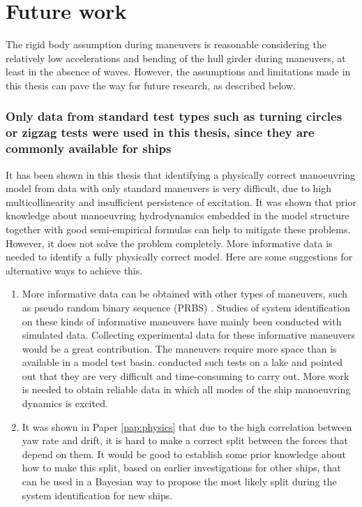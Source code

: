 \chapter{Future work\label{ch:future_work}}

The rigid body assumption during maneuvers is reasonable considering the relatively low accelerations and bending of the hull girder during maneuvers, at least in the absence of waves. However, the assumptions and limitations made in this thesis can pave the way for future research, as described below.

\subsection*{Only data from standard test types such as turning circles or zigzag tests were used in this thesis, since they are commonly available for ships}
It has been shown in this thesis that identifying a physically correct manoeuvring model from data with only standard maneuvers is very difficult, due to high multicollinearity and insufficient persistence of excitation. 
It was shown that prior knowledge about manoeuvring hydrodynamics embedded in the model structure together with good semi-empirical formulas can help to mitigate these problems.
However, it does not solve the problem completely. More informative data is needed to identify a fully physically correct model. Here are some suggestions for alternative ways to achieve this.
\begin{enumerate}[label=(\roman*),itemsep=1mm]
    
    \item More informative data can be obtained with other types of maneuvers, such as pseudo random binary sequence (PRBS) \cite{yoonIdentificationHydrodynamicCoefficients2003,wangOptimalDesignExcitation2020}. Studies of system identification on these kinds of informative maneuvers have mainly been conducted with simulated data. Collecting experimental data for these informative maneuvers would be a great contribution. The maneuvers require more space than is available in a model test basin. \textcite{millerShipModelIdentification2021} conducted such tests on a lake and pointed out that they are very difficult and time-consuming to carry out. More work is needed to obtain reliable data in which all modes of the ship manoeuvring dynamics is excited.
    
    \item It was shown in Paper \ref{pap:physics} that due to the high correlation between yaw rate and drift, it is hard to make a correct split between the forces that depend on them. It would be good to establish some prior knowledge about how to make this split, based on earlier investigations for other ships, that can be used in a Bayesian way to propose the most likely split during the system identification for new ships.  
        
\end{enumerate}

